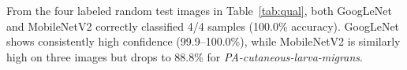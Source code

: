 \noindent From the four labeled random test images in Table~\ref{tab:qual}, both GoogLeNet and MobileNetV2 correctly classified 4/4 samples (100.0\% accuracy). GoogLeNet shows consistently high confidence (99.9--100.0\%), while MobileNetV2 is similarly high on three images but drops to 88.8\% for \emph{PA-cutaneous-larva-migrans}.
